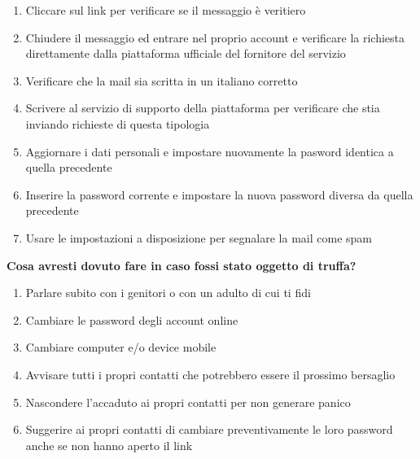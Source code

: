 \documentclass{article}
\begin{document}
\begin{enumerate}
	\item Cliccare sul link per verificare se il messaggio è veritiero
	\item Chiudere il messaggio ed entrare nel proprio account e verificare la richiesta direttamente dalla piattaforma ufficiale del fornitore del servizio
	\item Verificare che la mail sia scritta in un italiano corretto
	\item Scrivere al servizio di supporto della piattaforma per verificare che stia inviando richieste di questa tipologia
	\item Aggiornare i dati personali e impostare nuovamente la pasword identica a quella precedente
	\item Inserire la password corrente e impostare la nuova password diversa da quella precedente
	\item Usare le impostazioni a disposizione per segnalare la mail come spam
\end{enumerate}
\vspace{5mm}
\textbf{Cosa avresti dovuto fare in caso fossi stato oggetto di truffa?}
\begin{enumerate}
	\item Parlare subito con i genitori o con un adulto di cui ti fidi
	\item Cambiare le password degli account online
	\item Cambiare computer e/o device mobile
	\item Avvisare tutti i propri contatti che potrebbero essere il prossimo bersaglio
	\item Nascondere l'accaduto ai propri contatti per non generare panico
	\item Suggerire ai propri contatti di cambiare preventivamente le loro password anche se non hanno aperto il link
\end{enumerate}
\end{document}
